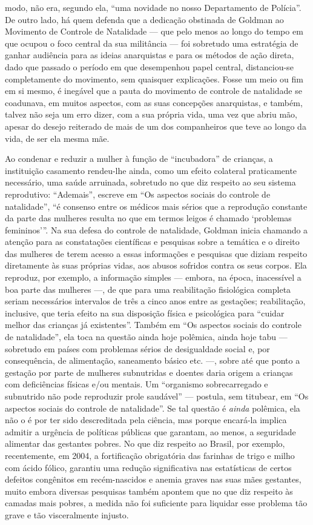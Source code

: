 modo, não era, segundo ela, ``uma novidade no nosso Departamento de
Polícia''. De outro lado, há quem defenda que a dedicação obstinada de
Goldman ao Movimento de Controle de Natalidade --- que pelo menos ao
longo do tempo em que ocupou o foco central da sua militância --- foi
sobretudo uma estratégia de ganhar audiência para as ideias anarquistas
e para os métodos de ação direta, dado que passado o período em que
desempenhou papel central, distanciou-se completamente do movimento, sem
quaisquer explicações. Fosse um meio ou fim em si mesmo, é inegável que
a pauta do movimento de controle de natalidade se coadunava, em muitos
aspectos, com as suas concepções anarquistas, e também, talvez não seja
um erro dizer, com a sua própria vida, uma vez que abriu mão, apesar do
desejo reiterado de mais de um dos companheiros que teve ao longo da
vida, de ser ela mesma mãe.

Ao condenar e reduzir a mulher à função de ``incubadora'' de crianças, a
instituição casamento rendeu-lhe ainda, como um efeito colateral
praticamente necessário, uma saúde arruinada, sobretudo no que diz
respeito ao seu sistema reprodutivo: ``Ademais'', escreve em ``Os
aspectos sociais do controle de natalidade'', ``é consenso entre os
médicos mais sérios que a reprodução constante da parte das mulheres
resulta no que em termos leigos é chamado `problemas femininos'''. Na
sua defesa do controle de natalidade, Goldman inicia chamando a atenção
para as constatações científicas e pesquisas sobre a temática e o
direito das mulheres de terem acesso a essas informações e pesquisas que
diziam respeito diretamente às suas próprias vidas, aos abusos sofridos
contra os seus corpos. Ela reproduz, por exemplo, a informação simples
--- embora, na época, inacessível a boa parte das mulheres ---, de que
para uma reabilitação fisiológica completa seriam necessários intervalos
de três a cinco anos entre as gestações; reabilitação, inclusive, que
teria efeito na sua disposição física e psicológica para ``cuidar melhor
das crianças já existentes''. Também em ``Os aspectos sociais do
controle de natalidade'', ela toca na questão ainda hoje polêmica, ainda
hoje tabu --- sobretudo em países com problemas sérios de desigualdade
social e, por consequência, de alimentação, saneamento básico etc. ---,
sobre até que ponto a gestação por parte de mulheres subnutridas e
doentes daria origem a crianças com deficiências físicas e/ou mentais.
Um ``organismo sobrecarregado e subnutrido não pode reproduzir prole
saudável'' --- postula, sem titubear, em ``Os aspectos sociais do
controle de natalidade''. Se tal questão é \emph{ainda} polêmica, ela
não o é por ter sido descreditada pela ciência, mas porque encará-la
implica admitir a urgência de políticas públicas que garantam, ao menos,
a seguridade alimentar das gestantes pobres. No que diz respeito ao
Brasil, por exemplo, recentemente, em 2004, a fortificação obrigatória
das farinhas de trigo e milho com ácido fólico, garantiu uma redução
significativa nas estatísticas de certos defeitos congênitos em
recém-nascidos e anemia graves nas suas mães gestantes, muito embora
diversas pesquisas também apontem que no que diz respeito às camadas
mais pobres, a medida não foi suficiente para liquidar esse problema tão
grave e tão visceralmente injusto.

